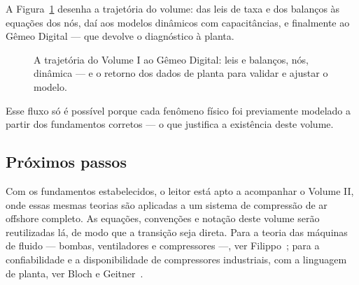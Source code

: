 \documentclass[12pt,a4paper]{article}
\numberwithin{equation}{section}
\numberwithin{table}{section}
\numberwithin{figure}{section}
\begin{document}
A Figura~\ref{fig:v1-c10-1} desenha a trajetória do volume: das leis de
taxa e dos balanços às equações dos nós, daí aos modelos dinâmicos com
capacitâncias, e finalmente ao Gêmeo Digital --- que devolve o diagnóstico
à planta.

\begin{figure}[H]
\centering
{}
\caption[Do modelo físico ao Gêmeo Digital.]{A trajetória do Volume I ao
Gêmeo Digital: leis e balanços, nós, dinâmica --- e o retorno dos dados de
planta para validar e ajustar o modelo.}
\label{fig:v1-c10-1}
\end{figure}


Esse fluxo só é possível porque cada fenômeno físico foi previamente modelado
a partir dos fundamentos corretos — o que justifica a existência deste volume.

\subsection{Próximos passos}

Com os fundamentos estabelecidos, o leitor está apto a acompanhar o Volume II,
onde essas mesmas teorias são aplicadas a um sistema de compressão de ar
offshore completo. As equações, convenções e notação deste volume serão
reutilizadas lá, de modo que a transição seja direta. Para a teoria das
máquinas de fluido --- bombas, ventiladores e compressores ---, ver
Filippo~\cite{filippo2015}; para a confiabilidade e a disponibilidade de
compressores industriais, com a linguagem de planta, ver Bloch e
Geitner~\cite{bloch2012}.


\end{document}
